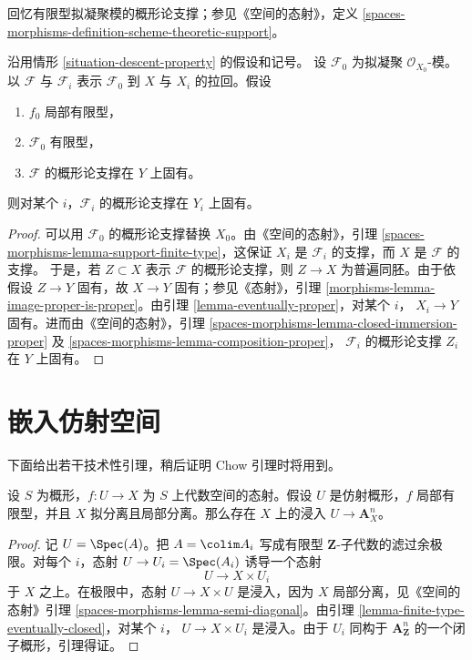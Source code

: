 \noindent
回忆有限型拟凝聚模的概形论支撑；参见《空间的态射》，定义
\ref{spaces-morphisms-definition-scheme-theoretic-support}。

\begin{lemma}
\label{lemma-eventually-proper-support}
沿用情形 \ref{situation-descent-property} 的假设和记号。
设 $\mathcal{F}_0$ 为拟凝聚 $\mathcal{O}_{X_0}$-模。
以 $\mathcal{F}$ 与 $\mathcal{F}_i$ 表示 $\mathcal{F}_0$
到 $X$ 与 $X_i$ 的拉回。假设
\begin{enumerate}
\item $f_0$ 局部有限型，
\item $\mathcal{F}_0$ 有限型，
\item $\mathcal{F}$ 的概形论支撑在 $Y$ 上固有。
\end{enumerate}
则对某个 $i$，$\mathcal{F}_i$ 的概形论支撑在 $Y_i$ 上固有。
\end{lemma}

\begin{proof}
可以用 $\mathcal{F}_0$ 的概形论支撑替换 $X_0$。由《空间的态射》，引理
\ref{spaces-morphisms-lemma-support-finite-type}，这保证 $X_i$
是 $\mathcal{F}_i$ 的支撑，而 $X$ 是 $\mathcal{F}$ 的支撑。
于是，若 $Z \subset X$ 表示 $\mathcal{F}$ 的概形论支撑，则
$Z \to X$ 为普遍同胚。由于依假设 $Z \to Y$ 固有，故
$X \to Y$ 固有；参见《态射》，引理
\ref{morphisms-lemma-image-proper-is-proper}。由引理
\ref{lemma-eventually-proper}，对某个 $i$，
$X_i \to Y$ 固有。进而由《空间的态射》，引理
\ref{spaces-morphisms-lemma-closed-immersion-proper} 及
\ref{spaces-morphisms-lemma-composition-proper}，
$\mathcal{F}_i$ 的概形论支撑 $Z_i$ 在 $Y$ 上固有。
\end{proof}








\section{嵌入仿射空间}
\label{section-embedding}

\noindent
下面给出若干技术性引理，稍后证明 Chow 引理时将用到。

\begin{lemma}
\label{lemma-embedding-into-affine-over-ls-qs}
设 $S$ 为概形，$f : U \to X$ 为 $S$ 上代数空间的态射。假设 $U$
是仿射概形，$f$ 局部有限型，并且 $X$ 拟分离且局部分离。那么存在
$X$ 上的浸入 $U \to \mathbf{A}^n_X$。
\end{lemma}

\begin{proof}
记 $U = \Spec(A)$。把 $A = \colim A_i$ 写成有限型
$\mathbf{Z}$-子代数的滤过余极限。对每个 $i$，态射
$U \to U_i = \Spec(A_i)$ 诱导一个态射
$$
U \longrightarrow X \times U_i
$$
于 $X$ 之上。在极限中，态射 $U \to X \times U$ 是浸入，因为
$X$ 局部分离，见《空间的态射》引理
\ref{spaces-morphisms-lemma-semi-diagonal}。由引理
\ref{lemma-finite-type-eventually-closed}，对某个 $i$，
$U \to X \times U_i$ 是浸入。由于 $U_i$ 同构于
$\mathbf{A}^n_{\mathbf{Z}}$ 的一个闭子概形，引理得证。
\end{proof}

